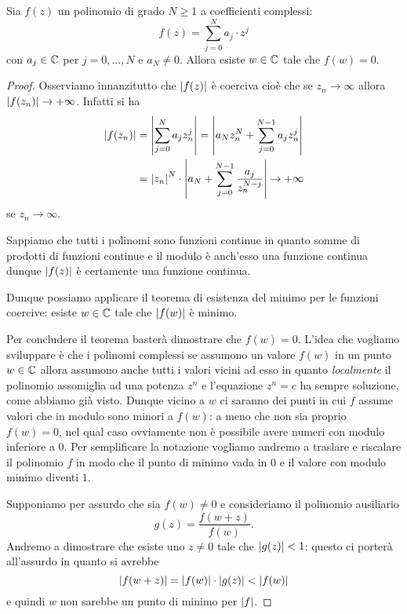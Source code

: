 \begin{theorem}
\label{th:fondamentale_algebra}
%
%
Sia $f(z)$ un polinomio di grado $N\ge 1$ a coefficienti complessi:
\[
  f(z) = \sum_{j=0}^N a_j \cdot z^j
\]
con $a_j\in \mathbb C$ per $j=0,\dots,N$ e $a_N \neq 0$.
Allora esiste $w\in \mathbb C$ tale che $f(w) = 0$.
\end{theorem}
%
\begin{proof}
Osserviamo innanzitutto che ${\left|f(z)\right|}$ è coerciva cioè che
se $z_n \to \infty$ allora ${\left|f(z_n)\right|}\to +\infty$.
Infatti si ha
\begin{align*}
  {\left|f(z_n)\right|}
  &= {\left|\sum_{j=0}^N a_j z_n^j\right|}
  = {\left|a_N z_n^N  + \sum_{j=0}^{N-1} a_j z_n^j\right|}\\
  &= {\left|z_n\right|}^N \cdot {\left|a_N + \sum_{j=0}^{N-1} \frac{a_j}{z_n^{N-j}}\right|}
  \to +\infty
\end{align*}
se $z_n \to \infty$.

Sappiamo che tutti i polinomi sono funzioni continue in quanto somme di prodotti di funzioni continue e il modulo è anch'esso una funzione continua dunque ${\left|f(z)\right|}$ è certamente una funzione continua.

Dunque possiamo applicare il teorema di esistenza del minimo per le funzioni coercive: esiste $w\in \mathbb C$ tale che ${\left|f(w)\right|}$ è minimo.

Per concludere il teorema basterà dimostrare che $f(w)=0$.
L'idea che vogliamo sviluppare è che i polinomi complessi se assumono un valore $f(w)$ in un punto $w\in \mathbb C$ allora assumono anche tutti i valori vicini ad esso in quanto \emph{localmente} il polinomio assomiglia ad una potenza $z^n$ e l'equazione $z^n=c$ ha sempre soluzione, come abbiamo già visto. Dunque vicino a $w$ ci saranno dei punti in cui $f$ assume valori che in modulo sono minori a $f(w)$: a meno che non sia proprio $f(w)=0$, nel qual caso ovviamente non è possibile avere numeri con modulo inferiore a $0$.
Per semplificare la notazione vogliamo andremo a traslare e riscalare il polinomio $f$ in modo che il punto di minimo vada in $0$ e il valore con modulo minimo diventi $1$.

Supponiamo per assurdo che sia $f(w)\neq 0$ e consideriamo il polinomio ausiliario
\[
  g(z) = \frac{f(w+z)}{f(w)}.
\]
Andremo a dimostrare che esiste uno $z\neq 0$ tale che ${\left|g(z)\right|}<1$:
questo ci porterà all'assurdo in quanto si avrebbe
\[
{\left|f(w+z)\right|} = {\left|f(w)\right|} \cdot {\left|g(z)\right|} < {\left|f(w)\right|}
\]
e quindi $w$ non sarebbe un punto di minimo per ${\left|f\right|}$.


\end{proof}
